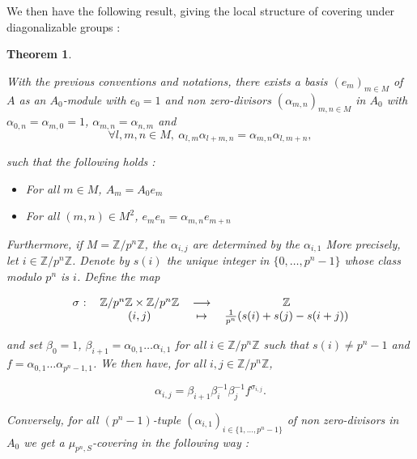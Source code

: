 \documentclass{amsart}
\newtheorem{theo}{Theorem}[section]
\theoremstyle{definition}
\theoremstyle{remark}
\begin{document}
We then have the following result, giving the local structure of covering under diagonalizable groups : 

\begin{theo}

\label{struct}

With the previous conventions and notations, there exists a basis $(e_m)_{m \in M}$ of $A$ as an $A_0$-module with $e_0 =1$ and non zero-divisors  $(\alpha_{m,n})_{m,n \in M}$ in $A_0$ with $\alpha_{0,n} = \alpha_{m,0} = 1$, $\alpha_{m,n}=\alpha_{n,m}$ and \[ \forall l,m,n \in M, \ \alpha_{l,m}\alpha_{l+m,n} = \alpha_{m,n}\alpha_{l,m+n}, \]

such that the following holds :  

\begin{itemize}

\item[(i)] For all $m \in M$, $A_m = A_0 e_m$ 
\item[(ii)] For all $(m,n) \in M^2$, $e_me_n = \alpha_{m,n}e_{m+n}$

\end{itemize}

Furthermore, if $M={\mathbb{Z}}/p^n {\mathbb{Z}}$, the $\alpha_{i,j}$ are determined by the $\alpha_{i,1}$ More precisely, let $i \in {\mathbb{Z}} / p^n {\mathbb{Z}}$. Denote by $s(i)$ the unique integer in $\{0,\dots,p^n-1\}$ whose class modulo $p^n$ is $i$. Define the map 

\[
 \begin{tabular}{cccc}

$\sigma$ :  & ${\mathbb{Z}} / p^n {\mathbb{Z}} \times {\mathbb{Z}} / p^n {\mathbb{Z}}$ & ${\longrightarrow}$ & ${\mathbb{Z}}$ \\ 

 & $(i,j)$ & $\mapsto$ & $\frac{1}{p^n}(s(i) + s(j) - s(i+j))$ \\ 

\end{tabular} \]

and set $\beta_0=1$, $\beta_{i+1} = \alpha_{0,1} \dots \alpha_{i,1}$ for all $i \in {\mathbb{Z}}/ p^n {\mathbb{Z}}$ such that $s(i) \neq p^n-1$ and $f = \alpha_{0,1} \dots \alpha_{p^n-1,1}$. We then have, for all $i,j \in {\mathbb{Z}} / p^n {\mathbb{Z}}$, 

\begin{equation} \label{equat} \alpha_{i,j} = \beta_{i+1}\beta_i^{-1}\beta_j^{-1}f^{\sigma_{i,j}}. \end{equation}

Conversely, for all $(p^n-1)$-tuple $(\alpha_{i,1})_{i \in \{1,\dots,p^n-1 \} }$ of non zero-divisors in $A_0$ we get a $\mu_{{p^n},S}$-covering in the following way : 


\end{theo}
\end{document}
